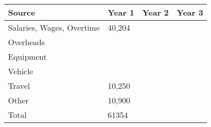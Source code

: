 \documentclass[version=last,
    paper=a4,                               %
    10pt,                                   %
    dvipsnames,
    oneside,                              %
    headings=openany,                       %
    open=any,
    BCOR=7mm,                               %
    DIV=15,     %
]{scrbook}
\begin{document}
\begin{longtabu} to \linewidth { |  X | X | X | X | }
\hline
{}
Source & Year 1 & Year 2 & Year 3\\
\hline
\endhead



Salaries, Wages, Overtime & 40,204 &  & \\



Overheads &  &  & \\



Equipment &  &  & \\



Vehicle &  &  & \\



Travel & 10,250 &  & \\



Other & 10,900 &  & \\



Total & 61354 &  & \\


\hline
\end{longtabu}





\end{document}

